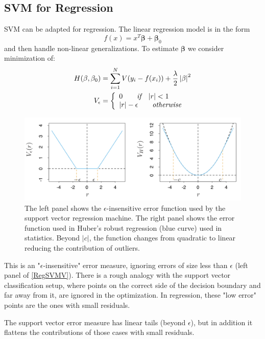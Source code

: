 \documentclass[12pt, letterpaper]{article}
\theoremstyle{definition}
\newcommand{\be}{\mathbf{\beta}}
\DeclarePairedDelimiter\autobracket{(}{)}
\newcommand{\br}[1]{\autobracket*{#1}}
\begin{document}
\subsection{SVM for Regression}
SVM can be adapted for regression. The linear regression model is in the form
\begin{equation}
f(x) = x^T\be+\be_0
\end{equation}
and then handle non-linear generalizations. To estimate $\be$ we consider minimization of:
\begin{equation}
\begin{aligned}
H(\be, \be_0) &= \sum_{i=1}^NV\br{y_i - f(x_i)}+\frac{\lambda}{2}\left|\be\right|^2\\
V_\epsilon &=\left\{\begin{array}{ll}0 \quad \quad \textit{if}\quad |r|<1 \\ 
 |r|-\epsilon  \quad \quad \textit{otherwise}
\end{array} 
\right.
\end{aligned}
\end{equation}
\begin{figure}
\centering
\includegraphics[width=\textwidth]{img/regSVMV}
\caption{The left panel shows the $\epsilon$-insensitive error function used by the support vector regression machine. The right panel shows the error function used in Huber’s robust regression (blue curve) used in statistics. Beyond $|c|$, the function changes from quadratic to linear reducing the contribution of outliers.}
\label{RegSVMV}
\end{figure}
This is an "$\epsilon$-insensitive" error measure, ignoring errors of size less than $\epsilon$ (left panel of \autoref{RegSVMV}). There is a rough analogy with the support vector classification setup, where points on the correct side of the decision boundary and far away from it, are ignored in the optimization. In regression, these "low error" points are the ones with small residuals.

The support vector error measure has linear tails (beyond $\epsilon$), but in addition it flattens the contributions of those cases with small residuals.
\end{document}
